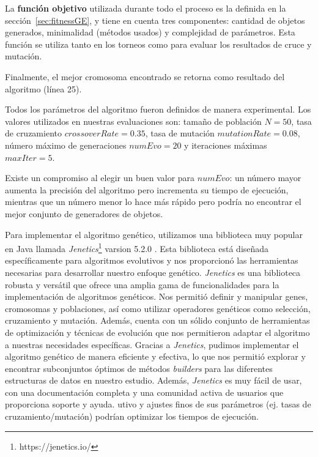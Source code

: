 La \textbf{función objetivo} utilizada durante todo el proceso es la definida en la sección~\ref{sec:fitnessGE}, y tiene en cuenta tres componentes: cantidad de objetos generados, minimalidad (métodos usados) y complejidad de parámetros. 
Esta función se utiliza tanto en los torneos como para evaluar los resultados de cruce y mutación.

Finalmente, el mejor cromosoma encontrado se retorna como resultado del algoritmo (línea 25).

Todos los parámetros del algoritmo fueron definidos de manera experimental.
Los valores utilizados en nuestras evaluaciones son: tamaño de población $N = 50$, tasa de cruzamiento $crossoverRate = 0.35$, tasa de mutación $mutationRate = 0.08$, número máximo de generaciones $numEvo = 20$ y iteraciones máximas $maxIter = 5$.
 
Existe un compromiso al elegir un buen valor para $numEvo$: un número mayor aumenta la precisión del algoritmo pero incrementa su tiempo de ejecución, 
mientras que un número menor lo hace más rápido pero podría no encontrar el
mejor conjunto de generadores de objetos.

Para implementar el algoritmo genético, utilizamos una biblioteca muy popular en Java llamada \emph{Jenetics}\footnote{https://jenetics.io/} varsion 5.2.0 . Esta biblioteca está diseñada específicamente para algoritmos evolutivos y nos proporcionó las herramientas necesarias para desarrollar nuestro enfoque genético.
\emph{Jenetics} es una biblioteca robusta y versátil que ofrece una amplia gama de funcionalidades para la implementación de algoritmos genéticos. Nos permitió definir y manipular genes, cromosomas y poblaciones, así como utilizar operadores genéticos como selección, cruzamiento y mutación. Además, cuenta con un sólido conjunto de herramientas de optimización y técnicas de evolución que nos permitieron adaptar el algoritmo a nuestras necesidades específicas.
Gracias a \emph{Jenetics}, pudimos implementar el algoritmo genético de manera eficiente y efectiva, lo que nos permitió explorar y encontrar subconjuntos óptimos de métodos \emph{builders} para las diferentes estructuras de datos en nuestro estudio. Además, \emph{Jenetics} es muy fácil de usar, con una documentación completa y una comunidad activa de usuarios que proporciona soporte y ayuda.
utivo y ajustes finos de sus parámetros (ej. tasas de cruzamiento/mutación) podrían optimizar los tiempos de ejecución.


